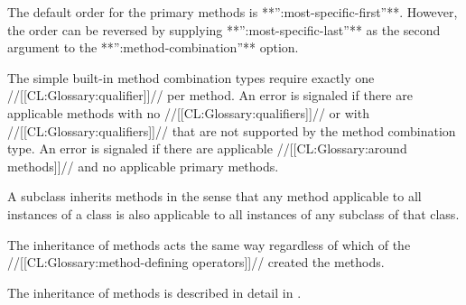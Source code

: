 \itemitem{} The default order for the primary methods is 
**'':most-specific-first''**.  However, the order can be reversed by supplying
**'':most-specific-last''** as the second argument to the **'':method-combination''** option.
\endlist

The simple built-in method combination types require exactly one
//[[CL:Glossary:qualifier]]// per method.  An error is signaled if there are applicable
methods with no //[[CL:Glossary:qualifiers]]// or with //[[CL:Glossary:qualifiers]]// that are not supported
by the method combination type. An error is signaled if there are
applicable //[[CL:Glossary:around methods]]// and no applicable primary
methods.

\endsubsubsection%

\endSubsection%


A subclass inherits methods in the sense that any method applicable to
all instances of a class is also applicable to all instances of any
subclass of that class.

The inheritance of methods acts the same way regardless of 
which of the //[[CL:Glossary:method-defining operators]]// created the methods.





The inheritance of methods is described in detail in 
\secref\MethodSelectionAndCombination.

\endSubsection%
